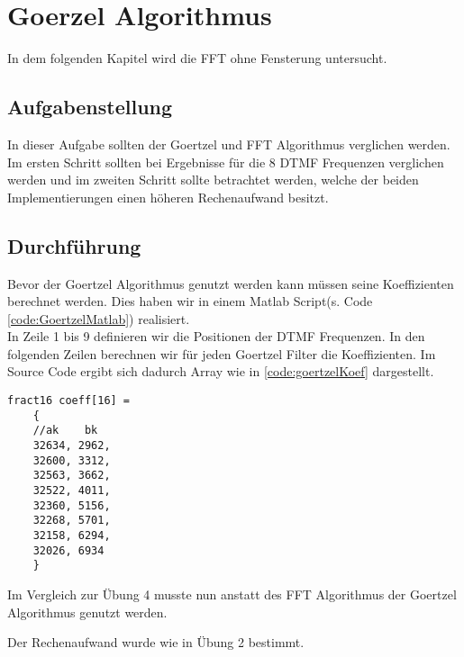\chapter{Goerzel Algorithmus}\label{Goertzel}
In dem folgenden Kapitel wird die FFT ohne Fensterung untersucht. 
\section{Aufgabenstellung}\label{GoertzelAuf}
In dieser Aufgabe sollten der Goertzel und FFT Algorithmus verglichen werden. Im ersten Schritt sollten bei Ergebnisse für die 8 DTMF Frequenzen verglichen werden und im zweiten Schritt sollte betrachtet werden, welche der beiden Implementierungen einen höheren Rechenaufwand besitzt. 
\section{Durchführung}\label{GoertzelDur}
Bevor der Goertzel Algorithmus genutzt werden kann müssen seine Koeffizienten berechnet werden. Dies haben wir in einem Matlab Script(s. Code \autoref{code:GoertzelMatlab}) realisiert.\\

In Zeile 1 bis 9 definieren wir die Positionen der DTMF Frequenzen. In den folgenden Zeilen berechnen wir für jeden Goertzel Filter die Koeffizienten.
Im Source Code ergibt sich dadurch Array wie in \autoref{code:goertzelKoef} dargestellt.
\begin{lstlisting}[caption={Array der Goertzel - Koeffizienten}, label={code:goertzelKoef}]
	fract16 coeff[16] = 
	{ 
	//ak	bk
	32634, 2962,
	32600, 3312,
	32563, 3662,
	32522, 4011,
	32360, 5156,
	32268, 5701, 
	32158, 6294,
	32026, 6934
	}
\end{lstlisting}
Im Vergleich zur Übung 4 musste nun anstatt des FFT Algorithmus der Goertzel Algorithmus genutzt werden.

Der Rechenaufwand wurde wie in Übung 2 bestimmt. 
